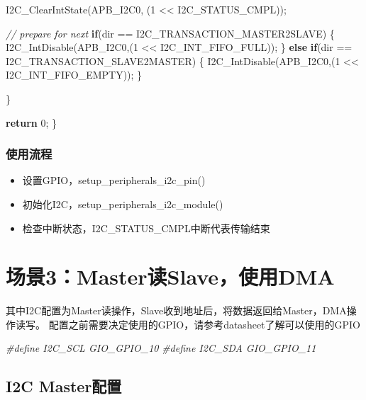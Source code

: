 \documentclass[
  12pt,
]{book}
\newenvironment{Shaded}{\begin{snugshade}}{\end{snugshade}}
\newcommand{\CommentTok}[1]{\textcolor[rgb]{0.56,0.35,0.01}{\textit{#1}}}
\newcommand{\ControlFlowTok}[1]{\textcolor[rgb]{0.13,0.29,0.53}{\textbf{#1}}}
\newcommand{\DecValTok}[1]{\textcolor[rgb]{0.00,0.00,0.81}{#1}}
\newcommand{\NormalTok}[1]{#1}
\newcommand{\PreprocessorTok}[1]{\textcolor[rgb]{0.56,0.35,0.01}{\textit{#1}}}
\providecommand{\tightlist}{%
  \setlength{\itemsep}{0pt}\setlength{\parskip}{0pt}}
\begin{document}
\begin{Shaded}
\begin{Highlighting}[]
\NormalTok{    I2C_ClearIntState(APB_I2C0, (}\DecValTok{1}\NormalTok{ << I2C_STATUS_CMPL));}
    
    \CommentTok{// prepare for next}
    \ControlFlowTok{if}\NormalTok{(dir == I2C_TRANSACTION_MASTER2SLAVE)}
\NormalTok{    \{}
\NormalTok{        I2C_IntDisable(APB_I2C0,(}\DecValTok{1}\NormalTok{ << I2C_INT_FIFO_FULL));}
\NormalTok{    \}}
    \ControlFlowTok{else} \ControlFlowTok{if}\NormalTok{(dir == I2C_TRANSACTION_SLAVE2MASTER)}
\NormalTok{    \{}
\NormalTok{        I2C_IntDisable(APB_I2C0,(}\DecValTok{1}\NormalTok{ << I2C_INT_FIFO_EMPTY));}
\NormalTok{    \}}

\NormalTok{  \}}


  \ControlFlowTok{return} \DecValTok{0}\NormalTok{;}
\NormalTok{\}}
\end{Highlighting}
\end{Shaded}

\hypertarget{ux4f7fux7528ux6d41ux7a0b-3}{%
\subsubsection{使用流程}\label{ux4f7fux7528ux6d41ux7a0b-3}}

\begin{itemize}
\tightlist
\item
  设置GPIO，setup\_peripherals\_i2c\_pin()
\item
  初始化I2C，setup\_peripherals\_i2c\_module()
\item
  检查中断状态，I2C\_STATUS\_CMPL中断代表传输结束
\end{itemize}

\hypertarget{ux573aux666f3masterux8bfbslaveux4f7fux7528dma}{%
\section{场景3：Master读Slave，使用DMA}\label{ux573aux666f3masterux8bfbslaveux4f7fux7528dma}}

其中I2C配置为Master读操作，Slave收到地址后，将数据返回给Master，DMA操作读写。 配置之前需要决定使用的GPIO，请参考datasheet了解可以使用的GPIO

\begin{Shaded}
\begin{Highlighting}[]
\PreprocessorTok{#define I2C_SCL         GIO_GPIO_10}
\PreprocessorTok{#define I2C_SDA         GIO_GPIO_11}
\end{Highlighting}
\end{Shaded}

\hypertarget{i2c-masterux914dux7f6e-2}{%
\subsection{I2C Master配置}\label{i2c-masterux914dux7f6e-2}}
\end{document}
